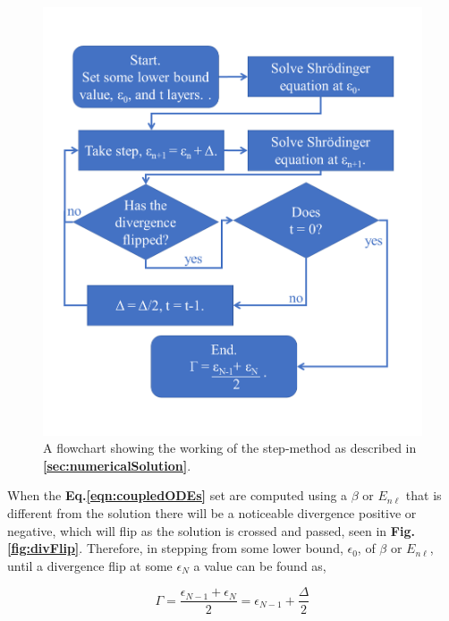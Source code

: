 \documentclass[10pt,twocolumn]{revtex4}    %
\begin{document}
\begin{figure}
    \centering
    \includegraphics[width = \linewidth]{gammaflowchart.png}
    \caption{A flowchart showing the working of the step-method as described in \textbf{\ref{sec:numericalSolution}}.}
    \label{fig:flowchart}
\end{figure}

When the \textbf{Eq.\ref{eqn:coupledODEs}} set are computed using a $\beta$ or $E_{n\ell}$ that is different from the solution there will be a noticeable divergence positive or negative, which will flip as the solution is crossed and passed, seen in \textbf{Fig.\ref{fig:divFlip}}. Therefore, in stepping from some lower bound, $\epsilon_0$, of $\beta$ or $E_{n\ell}$, until a divergence flip at some $\epsilon_N$ a value can be found as,

\begin{equation}
    \Gamma = \frac{\epsilon_{N-1} + \epsilon_N}{2} = \epsilon_{N-1} + \frac{\Delta}{2}
\end{equation}
\end{document}
